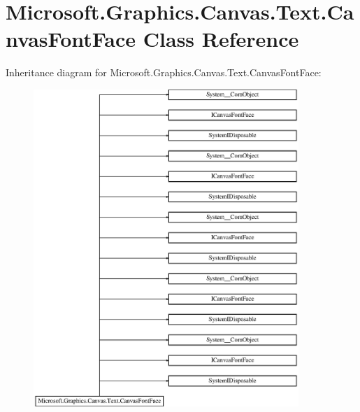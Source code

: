 \hypertarget{class_microsoft_1_1_graphics_1_1_canvas_1_1_text_1_1_canvas_font_face}{}\section{Microsoft.\+Graphics.\+Canvas.\+Text.\+Canvas\+Font\+Face Class Reference}
\label{class_microsoft_1_1_graphics_1_1_canvas_1_1_text_1_1_canvas_font_face}
Inheritance diagram for Microsoft.\+Graphics.\+Canvas.\+Text.\+Canvas\+Font\+Face\+:\begin{figure}[H]
\begin{center}
\leavevmode
\includegraphics[height=12.000000cm]{class_microsoft_1_1_graphics_1_1_canvas_1_1_text_1_1_canvas_font_face}
\end{center}
\end{figure}
